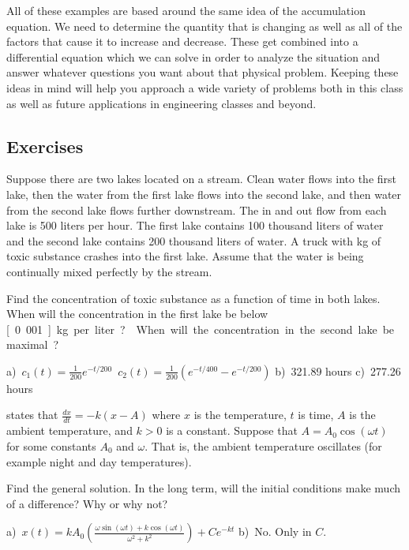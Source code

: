 All of these examples are based around the same idea of the accumulation equation. We need to determine the quantity that is changing as well as all of the factors that cause it to increase and decrease. These get combined into a differential equation which we can solve in order to analyze the situation and answer whatever questions you want about that physical problem. Keeping these ideas in mind will help you approach a wide variety of problems both in this class as well as future applications  in engineering classes and beyond.

\subsection{Exercises}

\begin{exercise}
Suppose there are two lakes located on a stream.  Clean
water flows into the first lake,
then the water from the first lake flows into the second lake, and then
water from the second lake flows further downstream.
The in and out flow from each lake is 500 liters per hour.
The first lake contains 100 thousand liters of water and the
second lake contains 200 thousand liters of water.
A truck with \unit[500]{kg} of toxic substance
crashes into the first lake.  Assume that the water is being continually
mixed perfectly by the stream.
\begin{tasks}
\task Find the concentration of toxic substance
as a function of time in both lakes.
\task When will the
concentration in the first lake be below \unit[0.001]{kg} per liter?
\task When will the
concentration in the second lake be maximal?
\end{tasks}
\end{exercise}
\comboSol{%
}
{%
a)~$c_1(t) = \frac{1}{200}e^{-t/200}$\ $c_2(t) = \frac{1}{200}(e^{-t/400} - e^{-t/200})$ \quad
b)~321.89 hours \quad c)~277.26 hours
}

\begin{exercise}
 states that $\frac{dx}{dt} = -k(x-A)$ where
$x$ is the temperature, $t$ is time, $A$ is the ambient temperature,
and $k > 0$ is a constant.
Suppose that $A = A_0 \cos (\omega t)$ for some constants $A_0$ and $\omega$.
That is, the ambient temperature oscillates (for example night and day
temperatures).
\begin{tasks}
\task Find the general solution.
\task In the long term, will the
initial conditions make much of a difference?  Why or why not?
\end{tasks}
\end{exercise}
\comboSol{%
}
{%
a)~$x(t) = kA_0 \left(\frac{\omega \sin(\omega t) + k\cos(\omega t)}{\omega^2 + k^2}\right) + Ce^{-kt}$ \quad
b)~No. Only in $C$.
}

